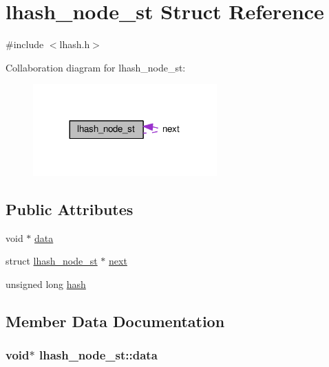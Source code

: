 \hypertarget{structlhash__node__st}{}\section{lhash\+\_\+node\+\_\+st Struct Reference}
\label{structlhash__node__st}


{\ttfamily \#include $<$lhash.\+h$>$}



Collaboration diagram for lhash\+\_\+node\+\_\+st\+:
\nopagebreak
\begin{figure}[H]
\begin{center}
\leavevmode
\includegraphics[width=200pt]{structlhash__node__st__coll__graph}
\end{center}
\end{figure}
\subsection*{Public Attributes}
\begin{DoxyCompactItemize}
\item 
void $\ast$ \hyperlink{structlhash__node__st_a1bddfe54547a8c35edc658730d8edcb7}{data}
\item 
struct \hyperlink{structlhash__node__st}{lhash\+\_\+node\+\_\+st} $\ast$ \hyperlink{structlhash__node__st_a9756db4182d64ae6212672d2d1cea695}{next}
\item 
unsigned long \hyperlink{structlhash__node__st_adae3442cad55dbd25659909f8f15ced7}{hash}
\end{DoxyCompactItemize}


\subsection{Member Data Documentation}
\subsubsection[{\texorpdfstring{data}{data}}]{\setlength{\rightskip}{0pt plus 5cm}void$\ast$ lhash\+\_\+node\+\_\+st\+::data}\hypertarget{structlhash__node__st_a1bddfe54547a8c35edc658730d8edcb7}{}\label{structlhash__node__st_a1bddfe54547a8c35edc658730d8edcb7}
